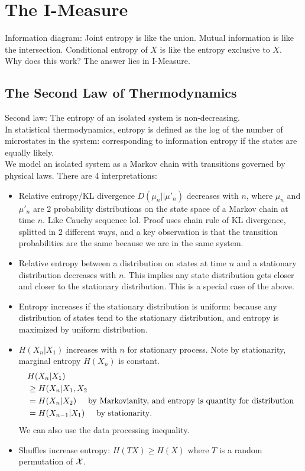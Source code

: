 \documentclass[../main.tex]{subfiles}
\begin{document}
\chapter{The I-Measure}
Information diagram:
Joint entropy is like the union. Mutual information is like the intersection. Conditional entropy of $X$ is like the entropy exclusive to $X$.\\
Why does this work? The answer lies in I-Measure. 
\section{The Second Law of Thermodynamics}
Second law: The entropy of an isolated system is non-decreasing. \\
In statistical thermodynamics, entropy is defined as the log of the number of microstates in the system: corresponding to information entropy if the states are equally likely.\\
We model an isolated system as a Markov chain with transitions governed by physical laws. There are 4 interpretations:
\begin{itemize}
    \item Relative entropy/KL divergence $D(\mu_n||\mu'_n)$ decreases with $n$, where $\mu_n$ and $\mu'_n$ are 2 probability distributions on the state space of a Markov chain at time $n$. Like Cauchy sequence lol.
    Proof uses chain rule of KL divergence, splitted in 2 different ways, and a key observation is that the transition probabilities are the same because we are in the same system.
    \item Relative entropy between a distribution on states at time $n$ and a stationary distribution decreases with $n$. This implies any state distribution gets closer and closer to the stationary distribution. This is a special case of the above.
    \item Entropy increases if the stationary distribution is uniform: because any distribution of states tend to the stationary distribution, and entropy is maximized by uniform distribution.
    \item $H(X_n|X_1)$ increases with $n$ for stationary process. Note by stationarity, marginal entropy $H(X_n)$ is constant.
    \begin{align*}
        &H(X_n|X_1)\\
        &\geq H(X_n|X_1,X_2\\
        &= H(X_n|X_2) \hspace{5mm} \text{by Markovianity, and entropy is quantity for distribution}\\
        &=H(X_{n-1}|X_1) \hspace{5mm} \text{by stationarity}.
    \end{align*}
    We can also use the data processing inequality.
    \item Shuffles increase entropy: $H(TX)\geq H(X)$ where $T$ is a random permutation of $\mathcal{X}$.
\end{itemize}
\end{document}
